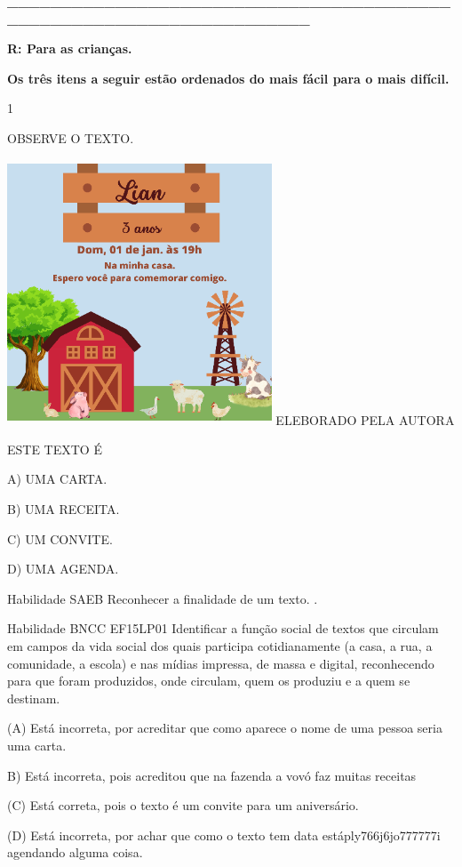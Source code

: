 \begin{escola}
\textbf{\_\_\_\_\_\_\_\_\_\_\_\_\_\_\_\_\_\_\_\_\_\_\_\_\_\_\_\_\_\_\_\_\_\_\_\_\_\_\_\_\_\_\_\_\_\_\_\_\_\_\_\_\_\_\_\_\_\_\_\_\_\_\_\_\_\_\_\_\_}

\textbf{R: Para as crianças.}


\textbf{Os três itens a seguir estão ordenados do mais fácil para o mais
difícil. }

\num{1}

OBSERVE O TEXTO.

\includegraphics[width=3.10106in,height=3.10106in]{media/image157.png}
ELEBORADO PELA AUTORA

ESTE TEXTO É

A) UMA CARTA.

B) UMA RECEITA.

C) UM CONVITE.

D) UMA AGENDA.

Habilidade SAEB Reconhecer a finalidade de um texto. .

Habilidade BNCC EF15LP01 Identificar a função social de textos que
circulam em campos da vida social dos quais participa cotidianamente (a
casa, a rua, a comunidade, a escola) e nas mídias impressa, de massa e
digital, reconhecendo para que foram produzidos, onde circulam, quem os
produziu e a quem se destinam.

(A) Está incorreta, por acreditar que como aparece o nome de uma pessoa
seria uma carta.

B) Está incorreta, pois acreditou que na fazenda a vovó faz muitas
receitas

(C) Está correta, pois o texto é um convite para um aniversário.

(D) Está incorreta, por achar que como o texto tem data
estáply766j6jo777777i agendando alguma
coisa.\protect\hypertarget{_heading=h.gz9yp347w1lz}{}{}


\end{escola}
